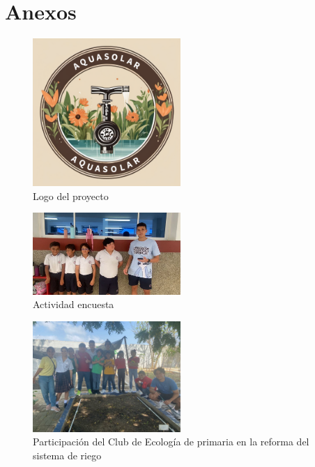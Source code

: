 \documentclass[12pt]{article}
\begin{document}
\newpage
\nocite{*}
\newpage
\section{Anexos}

\begin{figure}[h!]
      \centering
      \includegraphics[width=0.5\textwidth]{imagenes/logo.png}
      \caption{Logo del proyecto}
      \label{fig:logo}
\end{figure}

\begin{figure}[h!]
      \centering
      \includegraphics[width=0.5\textwidth]{imagenes/actividad1.jpg}
      \caption{Actividad encuesta}
      \label{fig:actividad1}
\end{figure}

\begin{figure}[h!]
      \centering
      \includegraphics[width=0.5\textwidth]{imagenes/actividad2.jpg}
      \caption{Participación del Club de Ecología de primaria en la reforma del sistema de riego}
      \label{fig:actividad2}
\end{figure}
\end{document}
